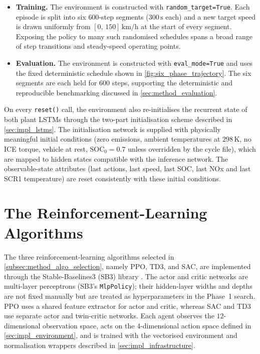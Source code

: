 \begin{itemize}
  \item \textbf{Training.} The environment is constructed with \texttt{random\_target=True}. Each episode is split into six $600$-step segments ($300\,\text{s}$ each) and a new target speed is drawn uniformly from $[0,\,150]\,\text{km/h}$ at the start of every segment. Exposing the policy to many such randomised schedules spans a broad range of step transitions and steady-speed operating points.
  \item \textbf{Evaluation.} The environment is constructed with \texttt{eval\_mode=True} and uses the fixed deterministic schedule shown in \autoref{fig:six_phase_trajectory}. The six segments are each held for $600$ steps, supporting the deterministic and reproducible benchmarking discussed in \autoref{sec:method_evaluation}.
\end{itemize}

On every \texttt{reset()} call, the environment also re-initialises the recurrent state of both plant \ac{LSTM}s through the two-part initialisation scheme described in \autoref{sec:impl_lstms}. The initialisation network is supplied with physically meaningful initial conditions (zero emissions, ambient temperatures at $298\,\text{K}$, no \ac{ICE} torque, vehicle at rest, $\mathrm{SOC}_0 = 0.7$ unless overridden by the cycle file), which are mapped to hidden states compatible with the inference network. The observable-state attributes (last actions, last speed, last \ac{SOC}, last \ac{NOx} and last SCR1 temperature) are reset consistently with these initial conditions.

\section{The Reinforcement-Learning Algorithms}
\label{sec:impl_algorithms}
The three reinforcement-learning algorithms selected in \autoref{subsec:method_algo_selection}, namely \ac{PPO}, \ac{TD3}, and \ac{SAC}, are implemented through the Stable-Baselines3 (SB3) library \cite{raffin_stable-baselines3_2021}. The actor and critic networks are multi-layer perceptrons (SB3's \texttt{MlpPolicy}); their hidden-layer widths and depths are not fixed manually but are treated as hyperparameters in the Phase~1 search. PPO uses a shared feature extractor for actor and critic, whereas SAC and TD3 use separate actor and twin-critic networks. Each agent observes the $12$-dimensional observation space, acts on the $4$-dimensional action space defined in \autoref{sec:impl_environment}, and is trained with the vectorised environment and normalisation wrappers described in \autoref{sec:impl_infrastructure}.

